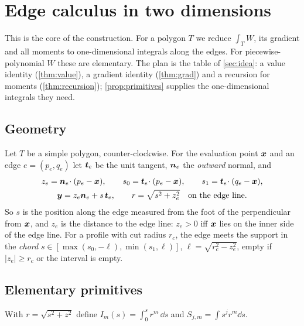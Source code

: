 \section{Edge calculus in two dimensions}\label{sec:edge}

This is the core of the construction. For a polygon $T$ we reduce $\int_T W$, its gradient and all
moments to one-dimensional integrals along the edges. For piecewise-polynomial $W$ these are elementary.
The plan is the table of \cref{sec:idea}: a value identity (\cref{thm:value}), a gradient identity (\cref{thm:grad})
and a recursion for moments (\cref{thm:recursion}); \cref{prop:primitives} supplies the one-dimensional integrals they need.

\subsection{Geometry}
Let $T$ be a simple polygon, counter-clockwise. For the evaluation point $\bm x$ and an edge $e=(p_e,q_e)$ let
$\bm t_e$ be the unit tangent, $\bm n_e$ the \emph{outward} normal, and
\begin{gather}
 z_e=\bm n_e\!\cdot(p_e-\bm x),\qquad s_0=\bm t_e\!\cdot(p_e-\bm x),\qquad s_1=\bm t_e\!\cdot(q_e-\bm x),\notag\\
 \bm y=z_e\bm n_e+s\,\bm t_e,\qquad r=\sqrt{s^2+z_e^2}\quad\text{on the edge line.}
\end{gather}
So $s$ is the position along the edge measured from the foot of the perpendicular from $\bm x$, and $z_e$ is the distance to the edge line:
$z_e>0$ iff $\bm x$ lies on the inner side of the edge line. For a profile with cut radius $r_c$, the
edge meets the support in the \emph{chord} $s\in[\max(s_0,-\ell),\min(s_1,\ell)]$, $\ell=\sqrt{r_c^2-z_e^2}$, empty if
$|z_e|\ge r_c$ or the interval is empty.

\subsection{Elementary primitives}
With $r=\sqrt{s^2+z^2}$ define $I_m(s)=\int_0^s r^m\,\dd s$ and $S_{j,m}=\int s^jr^m\dd s$.

